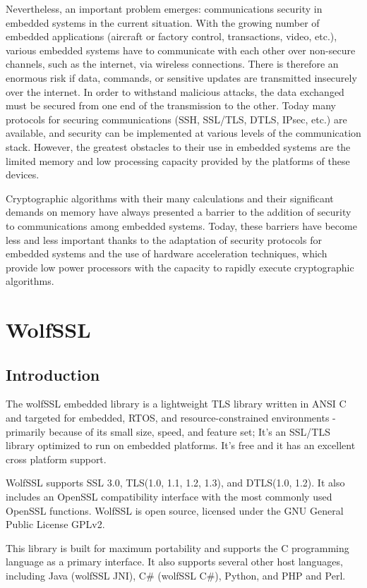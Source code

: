 \documentclass[a4paper,12pt]{article}
\begin{document}
Nevertheless, an important problem emerges: communications security in embedded systems in the current situation.
With the growing number of embedded applications (aircraft or factory control, transactions, video, etc.), various embedded systems have to communicate with each other over non-secure channels, such as the internet, via wireless connections. There is therefore an enormous risk if data, commands, or sensitive updates are transmitted insecurely over the internet. In order to withstand malicious attacks, the data exchanged must be secured from one end of the transmission to the other. Today many protocols for securing communications (SSH, SSL/TLS, DTLS, IPsec, etc.) are available, and security can be implemented at various levels of the communication stack. However, the greatest obstacles to their use in embedded systems are the limited memory and low processing capacity provided by the platforms of these devices.

Cryptographic algorithms with their many calculations and their significant demands on memory have always presented a barrier to the addition of security to communications among embedded systems. Today, these barriers have become less and less important thanks to the adaptation of security protocols for embedded systems and the use of hardware acceleration techniques, which provide low power processors with the capacity to rapidly execute cryptographic algorithms.

\section{WolfSSL}
\subsection{Introduction}

The wolfSSL embedded library is a lightweight TLS library written in ANSI C and targeted for embedded, RTOS, and resource-constrained
environments - primarily because of its small size, speed, and feature set; It's an SSL/TLS library optimized to run on embedded platforms.
It's free and it has an excellent cross platform support.

WolfSSL supports SSL 3.0, TLS(1.0, 1.1, 1.2, 1.3), and DTLS(1.0, 1.2).
It also includes an OpenSSL compatibility interface with the most commonly used OpenSSL functions.
WolfSSL is open source, licensed under the GNU General Public License GPLv2.

This library is built for maximum portability and supports the C programming language as a primary interface. It also supports several other host languages, including Java (wolfSSL JNI), C\# (wolfSSL C\#), Python, and PHP and Perl.
\end{document}
